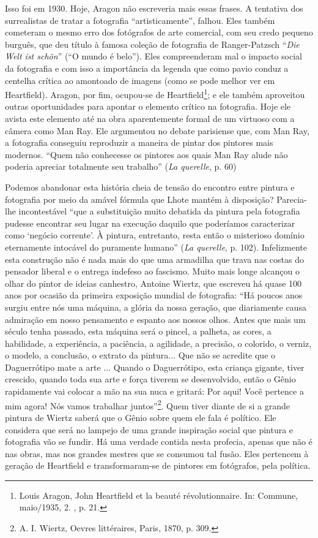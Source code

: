 Isso foi em 1930. Hoje, Aragon não escreveria mais essas frases. A
tentativa dos surrealistas de tratar a fotografia ``artisticamente'',
falhou. Eles também cometeram o mesmo erro dos fotógrafos de arte
comercial, com seu credo pequeno burguês, que deu título à famosa
coleção de fotografia de Ranger-Patzsch ``\emph{Die Welt ist schön}''
(``O mundo é belo''). Eles compreenderam mal o impacto social da
fotografia e com isso a importância da legenda que como pavio conduz a
centelha crítica ao amontoado de imagens (como se pode melhor ver em
Heartfield). Aragon, por fim, ocupou-se de Heartfield\footnote{Louis
  Aragon, John Heartfield et la beauté révolutionnaire. In: Commune,
  maio/1935, 2. , p. 21.}; e ele também aproveitou outras oportunidades
para apontar o elemento crítico na fotografia. Hoje ele avista este
elemento até na obra aparentemente formal de um virtuoso com a câmera
como Man Ray. Ele argumentou no debate parisiense que, com Man Ray, a
fotografia conseguiu reproduzir a maneira de pintar dos pintores mais
modernos. ``Quem não conhecesse os pintores aos quais Man Ray alude não
poderia apreciar totalmente seu trabalho'' (\emph{La querelle}, p. 60)

Podemos abandonar esta história cheia de tensão do encontro entre
pintura e fotografia por meio da amável fórmula que Lhote mantém à
disposição? Parecia-lhe incontestável ``que a substituição muito
debatida da pintura pela fotografia pudesse encontrar seu lugar na
execução daquilo que poderíamos caracterizar como `negócio corrente'. À
pintura, entretanto, resta então o misterioso domínio eternamente
intocável do puramente humano'' (\emph{La querelle}, p. 102).
Infelizmente esta construção não é nada mais do que uma armadilha que
trava nas costas do pensador liberal e o entrega indefeso ao fascismo.
Muito mais longe alcançou o olhar do pintor de ideias canhestro, Antoine
Wiertz, que escreveu há quase 100 anos por ocasião da primeira exposição
mundial de fotografia: ``Há poucos anos surgiu entre nós uma máquina, a
glória da nossa geração, que diariamente causa admiração em nosso
pensamento e espanto aos nossos olhos. Antes que mais um século tenha
passado, esta máquina será o pincel, a palheta, as cores, a habilidade,
a experiência, a paciência, a agilidade, a precisão, o colorido, o
verniz, o modelo, a conclusão, o extrato da pintura... Que não se
acredite que o Daguerrótipo mate a arte ... Quando o Daguerrótipo, esta
criança gigante, tiver crescido, quando toda sua arte e força tiverem se
desenvolvido, então o Gênio rapidamente vai colocar a mão na sua nuca e
gritará: Por aqui! Você pertence a mim agora! Nós vamos trabalhar
juntos''\footnote{A. I. Wiertz, Oevres littéraires, Paris, 1870, p. 309.}.
Quem tiver diante de si a grande pintura de Wiertz saberá que o Gênio
sobre quem ele fala é político. Ele considera que será no lampejo de uma
grande inspiração social que pintura e fotografia vão se fundir. Há uma
verdade contida nesta profecia, apenas que não é nas obras, mas nos
grandes mestres que se consumou tal fusão. Eles pertencem à geração de
Heartfield e transformaram-se de pintores em fotógrafos, pela política.

